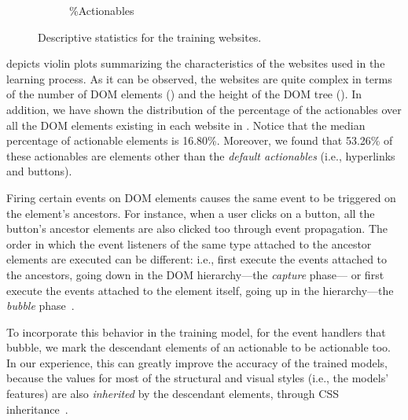 \begin{figure}
\begin{subfigure}[b]{0.32\linewidth}
		\caption{\%Actionables}
		\label{fig:percentage-elements-listeners}
	\end{subfigure}
	\caption{Descriptive statistics for the training websites.}
	\label{fig:websites-info}
\end{figure}

 depicts violin plots
summarizing the characteristics of the websites 
used in the learning process.
As it can be observed, the websites are quite complex
in terms of the number of DOM elements ()
and the height of the DOM tree ().
In addition, we have shown the distribution of the percentage of the actionables
over all the DOM elements existing in each website
in .
Notice that the median percentage of actionable elements is 16.80\%.
Moreover, we found that 53.26\% of these actionables 
are elements other than the \textit{default actionables} (i.e., hyperlinks and buttons).

Firing certain events on DOM elements 
causes the same event to be triggered on the element's ancestors.
For instance, when a user clicks on a button,
all the button's ancestor elements are also clicked too through event propagation.
The order in which the event listeners of the same type
attached to the ancestor elements
are executed can be different: %
i.e., first execute the events attached to the ancestors, going down in the DOM hierarchy---the \textit{capture} phase---%
or first execute the events attached to the element itself, going up in the hierarchy---the \textit{bubble} phase~\cite{event-bubble-capture}.

To incorporate this behavior in the training model,
for the event handlers that bubble,
we mark the descendant elements of an actionable
to be actionable too.
In our experience, this can greatly improve the accuracy of the trained models,
because the values for most of the structural and visual styles (i.e., the models' features)
are also \textit{inherited} by the descendant elements, through CSS inheritance~\cite{css-cascade-inheritance}.


